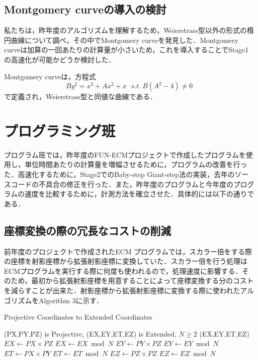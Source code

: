 \documentclass[openany,11pt,papersize]{jsbook}
\begin{document}

\subsection{Montgomery curveの導入の検討}

私たちは，昨年度のアルゴリズムを理解するため，Weierstrass型以外の形式の楕円曲線について調べ，その中でMontgomery curveを発見した．Montgomery curveは加算の一回あたりの計算量が小さいため，これを導入することでStage1の高速化が可能かどうか検討した．

Montgomery curveは，方程式
\[
By^2 = x^3 + Ax^2 + x \ \ \ s.t. \ B(A^2-4) \neq 0
\]
で定義され，Weierstrass型と同値な曲線である．



\section{プログラミング班}
プログラム班では，昨年度のFUN-ECMプロジェクトで作成したプログラムを使用し，単位時間あたりの計算量を増幅させるために，プログラムの改善を行った．高速化するために，Stage2でのBaby-step Giant-step法の実装，去年のソースコードの不具合の修正を行った．また，昨年度のプログラムと今年度のプログラムの速度を比較するために，計測方法を確立させた．具体的には以下の通りである．


\subsection{座標変換の際の冗長なコストの削減}\label{sec:alg1}
前年度のプロジェクトで作成されたECM プログラムでは，スカラー倍をする際の座標を射影座標から拡張射影座標に変換していた．スカラー倍を行う処理はECMプログラムを実行する際に何度も使われるので，処理速度に影響する．そのため，最初から拡張射影座標を用意することによって座標変換する分のコストを減らすことが出来た．射影座標から拡張射影座標に変換する際に使われたアルゴリズムをAlgorithm 3に示す．

\begin{algorithm}[H]                      
\caption{Projective Coordinates to Extended Coordinates}         
\label{alg1}                          
\begin{algorithmic}                  
\REQUIRE (PX,PY,PZ) is Projective, (EX,EY,ET,EZ) is Extended, $N \geq 2$
\ENSURE (EX,EY,ET,EZ)
\STATE $EX \leftarrow PX \times PZ$
\STATE $EX \leftarrow EX \bmod N$
\STATE $EY \leftarrow PY \times PZ$
\STATE $EY \leftarrow EY \bmod N$
\STATE $ET \leftarrow PX \times PY$
\STATE $ET \leftarrow ET \bmod N$
\STATE $EZ \leftarrow PZ \times PZ$
\STATE $EZ \leftarrow EZ \bmod N$
\end{algorithmic}
\end{algorithm}
\end{document}
